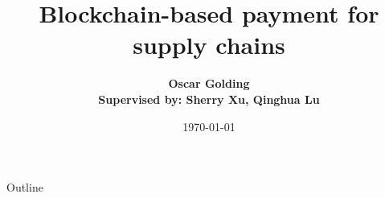 \documentclass{beamer}
\title{Blockchain-based payment for supply chains}
\author[Oscar Golding]
{\textbf {Oscar Golding
\texorpdfstring{\\} 
\footnotesize Supervised by: Sherry Xu, Qinghua Lu}}
\institute[UNSW]{Thesis A: UNSW}
\date{\today}
\begin{document}
\begin{frame}
    \titlepage
\end{frame}

\begin{frame}{Outline}
    \tableofcontents
\end{frame}








\end{document}
